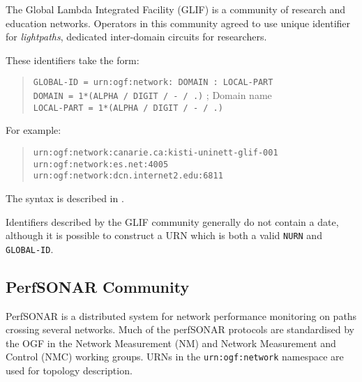 \documentclass[12pt]{article}  %
\begin{document}
The Global Lambda Integrated Facility (GLIF) is a community of research and 
education networks. Operators in this community agreed to use unique identifier 
for \emph{lightpaths}, dedicated inter-domain circuits for researchers.

These identifiers take the form:
\begin{quote}
  \texttt{GLOBAL-ID = \qq{}urn:ogf:network:\qq{} DOMAIN \qq{}:\qq{} LOCAL-PART } \\
  \texttt{DOMAIN = 1*(ALPHA / DIGIT / \qq{}-\qq{} / \qq{}.\qq{})} ; Domain name \\
  \texttt{LOCAL-PART = 1*(ALPHA / DIGIT / \qq{}-\qq{} / \qq{}.\qq{})}
\end{quote}

For example:
\begin{quote}
\texttt{urn:ogf:network:canarie.ca:kisti-uninett-glif-001} \\
\texttt{urn:ogf:network:es.net:4005} \\
\texttt{urn:ogf:network:dcn.internet2.edu:6811}
\end{quote}

The syntax is described in \cite{glif-identifiers}.

Identifiers described by the GLIF community generally do not contain a date, although it is possible to construct a URN which is both a valid \texttt{NURN} and \texttt{GLOBAL-ID}.

\subsection{PerfSONAR Community} %
\label{sec:perfsonar}

PerfSONAR is a distributed system for network performance monitoring on 
paths crossing several networks. Much of the perfSONAR protocols are 
standardised by the OGF in the Network Measurement (NM) and Network 
Measurement and Control (NMC) working groups. 
URNs in the \texttt{urn:ogf:network} namespace are used for topology description.
\end{document}

